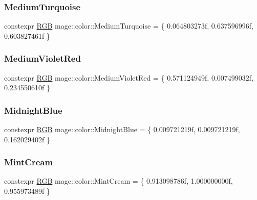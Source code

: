 \mbox{\label{namespacemage_1_1color_addbe783ed9989a03f0a3033e47f4f7dc}} 
\subsubsection{\texorpdfstring{Medium\+Turquoise}{MediumTurquoise}}
{\footnotesize\ttfamily constexpr \mbox{\hyperlink{structmage_1_1_r_g_b}{R\+GB}} mage\+::color\+::\+Medium\+Turquoise = \{ 0.\+064803273f, 0.\+637596996f, 0.\+603827461f \}}

\mbox{\label{namespacemage_1_1color_aa122b0bf6b5374aaf7d77f1d4e9095ae}} 
\subsubsection{\texorpdfstring{Medium\+Violet\+Red}{MediumVioletRed}}
{\footnotesize\ttfamily constexpr \mbox{\hyperlink{structmage_1_1_r_g_b}{R\+GB}} mage\+::color\+::\+Medium\+Violet\+Red = \{ 0.\+571124949f, 0.\+007499032f, 0.\+234550610f \}}

\mbox{\label{namespacemage_1_1color_a973485679cfd59ce6ca47a4f96104a62}} 
\subsubsection{\texorpdfstring{Midnight\+Blue}{MidnightBlue}}
{\footnotesize\ttfamily constexpr \mbox{\hyperlink{structmage_1_1_r_g_b}{R\+GB}} mage\+::color\+::\+Midnight\+Blue = \{ 0.\+009721219f, 0.\+009721219f, 0.\+162029402f \}}

\mbox{\label{namespacemage_1_1color_a545b07f3dbe9d887c33cd6575123d88d}} 
\subsubsection{\texorpdfstring{Mint\+Cream}{MintCream}}
{\footnotesize\ttfamily constexpr \mbox{\hyperlink{structmage_1_1_r_g_b}{R\+GB}} mage\+::color\+::\+Mint\+Cream = \{ 0.\+913098786f, 1.\+000000000f, 0.\+955973489f \}}


